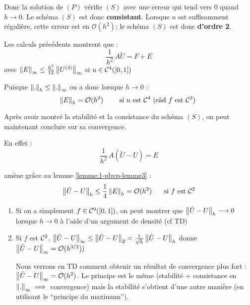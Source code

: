     Donc la solution de $(P)$ vérifie $(S)$ avec une erreur qui tend vers 0 quand
    $h \to 0$. Le schéma $(S)$ est donc \textbf{consistant}. Lorsque $u$
    est suffisamment régulière, cette erreur est en $\mathcal{O}(h^2)$;
    le schéma $(S)$ est donc \textbf{d'ordre 2}.

    Les calculs précédents montrent que :
    \[
        \frac{1}{h^2} \, A \tilde U = F + E
    \]
    \hfill avec $\left\lVert E\right\rVert_\infty \leq \frac{h^2}{12} \left\lVert U^{(4)}\right\rVert_\infty$ si
    $u \in \mathcal{C}^4([0,1])$

    Puisque $\left\lVert.\right\rVert_h \leq \left\lVert.\right\rVert_\infty$ on a donc lorsque $h \to 0$ :
    \[
        \left\lVert E\right\rVert_h = \mathcal{O}(h^2) \hspace{0.7cm} \text{ si $u$ est $\mathcal{C}^4$ (càd $f$ est $\mathcal{C}^2$) }
    \]

    Après avoir montré la stabilité et la consistance du schéma $(S)$, on peut
    maintenant conclure sur sa convergence.

    En effet :
    \[
        \frac{1}{h^2} \, A(\tilde U - U) = E
    \]

    amène grâce au lemme \ref{lemme:1-pbvp-lemme3} :
    \[
        \left\lVert\tilde U - U\right\rVert_h \leq \frac{1}{4} \left\lVert E\right\rVert_h = \mathcal O(h^2)
        \hspace{0.5cm} \text{ si $f$ est $\mathcal{C}^2$}
    \]

    \begin{remark}
        \begin{enumerate}[label=•]
            \item Si on a simplement $f \in \mathcal{C}^0([0,1])$, on peut montrer
                que $\left\lVert\tilde U - U\right\rVert_h \longrightarrow 0$ lorsque $h \to 0$
                à l'aide d'un argument de densité (cf TD)

            \item Si $f$ est $\mathcal{C}^2$, $\left\lVert\tilde U - U\right\rVert_\infty \leq \left\lVert\tilde U - U\right\rVert_2 = \frac{1}{\sqrt h} \left\lVert\tilde U - U\right\rVert_h$ donne
                $\left\lVert\tilde U - U\right\rVert_\infty = \mathcal O (h^{3/2}))$

                Nous verrons en TD comment obtenir un résultat de convergence
                plus fort : $\left\lVert\tilde U - U\right\rVert_\infty = \mathcal O (h^2)$.
                Le principe est le même (stabilité + consistance en $\left\lVert.\right\rVert_\infty \implies $ convergence)
                mais la stabilité s'obtient d'une autre manière (en utilisant
                le ``principe du maximum'').
        \end{enumerate}
    \end{remark}

